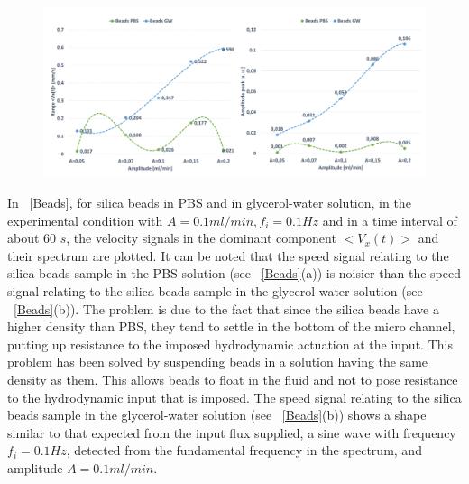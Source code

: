 \documentclass[journal]{IEEEtran}
\theoremstyle{definition}
\theoremstyle{remark}
\begin{document}
\begin{figure}[h!]
	\centering
	\includegraphics[width=1\columnwidth]{images/BeadsFinal}
\end{figure}

In ~\fig\ref{Beads}, for silica beads in PBS and in glycerol-water solution, in the experimental condition with {$A=0.1 ml/min, f_i= 0.1 Hz$} and in a time interval of about 60 $s$, the velocity signals in the dominant component  $<V_x(t)>$ and their spectrum are plotted.
It can be noted that the speed signal relating to the silica beads sample in the PBS solution (see ~\fig\ref{Beads}(a)) is noisier than the speed signal relating to the silica beads sample in the glycerol-water solution (see ~\fig\ref{Beads}(b)). The problem is due to the fact that since the silica beads have a higher density than PBS, they tend to settle in the bottom of the micro channel, putting up resistance to the imposed hydrodynamic actuation at the input. This problem has been solved by suspending beads in a solution having the same density as them. This allows beads to float in the fluid and not to pose resistance to the hydrodynamic input that is imposed. The speed signal relating to the silica beads sample in the glycerol-water solution (see ~\fig\ref{Beads}(b)) shows a shape similar to that expected from the input flux supplied, a sine wave with frequency $f_i= 0.1 Hz$, detected from the fundamental frequency in the spectrum, and amplitude $A={0.1 ml/min}$.
\end{document}
